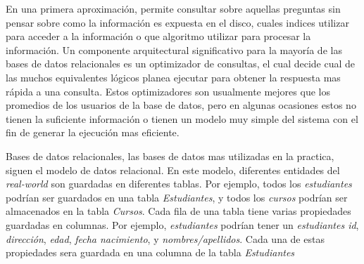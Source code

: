 En una primera aproximación, \sql permite consultar sobre aquellas preguntas sin pensar sobre como la información es expuesta en el disco, cuales indices utilizar para acceder a la información o que algoritmo utilizar para procesar la información. Un componente arquitectural significativo para la mayoría de las bases de datos relacionales es un optimizador de consultas, el cual decide cual de las muchos equivalentes lógicos planea ejecutar para obtener la respuesta mas rápida a una consulta. Estos optimizadores son usualmente mejores que los promedios de los usuarios de la base de datos, pero en algunas ocasiones estos no tienen la suficiente información o tienen un modelo muy simple del sistema con el fin de generar la ejecución mas eficiente.

Bases de datos relacionales, las bases de datos mas utilizadas en la practica, siguen el modelo de datos relacional. En este modelo, diferentes entidades del \textit{real-world} son guardadas en diferentes tablas. Por ejemplo, todos los \textit{estudiantes} podrían ser guardados en una tabla \textit{Estudiantes}, y todos los \textit{cursos} podrían ser almacenados en la tabla \textit{Cursos}. Cada fila de una tabla tiene varias propiedades guardadas en columnas. Por ejemplo, \textit{estudiantes} podrían tener un \textit{estudiantes id}, \textit{dirección}, \textit{edad},  \textit{fecha nacimiento}, y \textit{nombres/apellidos}. Cada una de estas propiedades sera guardada en una columna de la tabla \textit{Estudiantes}


